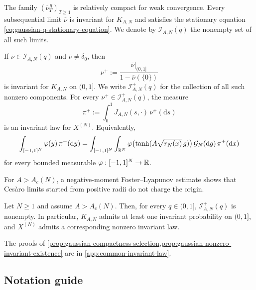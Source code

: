 \documentclass[11pt,reqno,a4paper]{article}
\begin{document}
\begin{proposition}
\label{prop:gaussian-compactness-selection}
  The family $(\overline\nu_T^{\,q})_{T\geq1}$ is relatively compact for weak
  convergence. Every subsequential limit $\overline\nu$ is invariant for
  $K_{A,N}$ and satisfies the stationary equation
  \cref{eq:gaussian-q-stationary-equation}. We denote by
  $\mathcal I_{A,N}(q)$ the nonempty set of all such limits.

  If $\overline\nu\in\mathcal I_{A,N}(q)$ and
  $\overline\nu\neq\delta_0$, then
  \begin{equation*}
    \nu^+
    :=
    \frac{\overline\nu|_{(0,1]}}{1-\overline\nu(\{0\})}
  \end{equation*}
  is invariant for $K_{A,N}$ on $(0,1]$. We write
  $\mathcal I_{A,N}^+(q)$ for the collection of all such nonzero components.
  For every $\nu^+\in\mathcal I_{A,N}^+(q)$, the measure
  \begin{equation}\label{eq:gaussian-compactness-vector-law}
    \pi^+:=\int_0^1 J_{A,N}(s,\cdot)\,\nu^+(\mathrm{d}s)
  \end{equation}
  is an invariant law for $X^{(N)}$. Equivalently,
  \begin{equation}\label{eq:gaussian-vector-weak-stationary-equation}
    \int_{[-1,1]^N}\varphi(y)\,\pi^+(\mathrm{d}y)
    =
    \int_{[-1,1]^N}
    \int_{\mathbb{R}^N}
    \varphi\bigl(\tanh(A\sqrt{r_N(x)}\,g)\bigr)\,
    \mathcal G_N(\mathrm{d}g)\,
    \pi^+(\mathrm{d}x)
  \end{equation}
  for every bounded measurable $\varphi:[-1,1]^N\to\mathbb{R}$.
\end{proposition}

For $A>A_c(N)$, a negative-moment Foster--Lyapunov estimate shows that Cesàro
limits started from positive radii do not charge the origin.
\begin{proposition}
\label{prop:gaussian-nonzero-invariant-existence}
  Let $N\geq1$ and assume $A>A_c(N)$. Then, for every $q\in(0,1]$,
  $\mathcal I_{A,N}^+(q)$ is nonempty. In particular, $K_{A,N}$ admits at
  least one invariant probability on $(0,1]$, and $X^{(N)}$ admits a
  corresponding nonzero invariant law.
\end{proposition}

The proofs of \cref{prop:gaussian-compactness-selection,prop:gaussian-nonzero-invariant-existence} are in \cref{app:common-invariant-law}.

\clearpage
\subsection{Notation guide}
\label{subsec:notation-guide}
\end{document}
